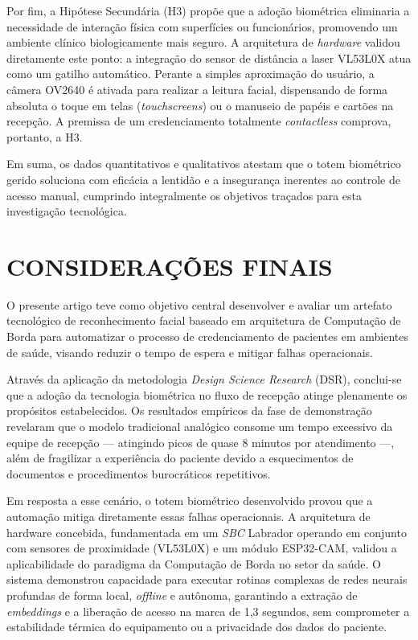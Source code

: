 Por fim, a Hipótese Secundária (H3) propõe que a adoção biométrica eliminaria a necessidade de interação física com superfícies ou funcionários, promovendo um ambiente clínico biologicamente mais seguro. A arquitetura de \textit{hardware} validou diretamente este ponto: a integração do sensor de distância a laser VL53L0X atua como um gatilho automático. Perante a simples aproximação do usuário, a câmera OV2640 é ativada para realizar a leitura facial, dispensando de forma absoluta o toque em telas (\textit{touchscreens}) ou o manuseio de papéis e cartões na recepção. A premissa de um credenciamento totalmente \textit{contactless} comprova, portanto, a H3.  

Em suma, os dados quantitativos e qualitativos atestam que o totem biométrico gerido soluciona com eficácia a lentidão e a insegurança inerentes ao controle de acesso manual, cumprindo integralmente os objetivos traçados para esta investigação tecnológica.

\section{CONSIDERAÇÕES FINAIS}
\label{sec:consideracoes-finais}

O presente artigo teve como objetivo central desenvolver e avaliar um artefato tecnológico de reconhecimento facial baseado em arquitetura de Computação de Borda para automatizar o processo de credenciamento de pacientes em ambientes de saúde, visando reduzir o tempo de espera e mitigar falhas operacionais.  

Através da aplicação da metodologia \textit{Design Science Research} (DSR), conclui-se que a adoção da tecnologia biométrica no fluxo de recepção atinge plenamente os propósitos estabelecidos. Os resultados empíricos da fase de demonstração revelaram que o modelo tradicional analógico consome um tempo excessivo da equipe de recepção — atingindo picos de quase 8 minutos por atendimento —, além de fragilizar a experiência do paciente devido a esquecimentos de documentos e procedimentos burocráticos repetitivos.  

Em resposta a esse cenário, o totem biométrico desenvolvido provou que a automação mitiga diretamente essas falhas operacionais. A arquitetura de hardware concebida, fundamentada em um \textit{SBC} Labrador operando em conjunto com sensores de proximidade (VL53L0X) e um módulo ESP32-CAM, validou a aplicabilidade do paradigma da Computação de Borda no setor da saúde. O sistema demonstrou capacidade para executar rotinas complexas de redes neurais profundas de forma local, \textit{offline} e autônoma, garantindo a extração de \textit{embeddings} e a liberação de acesso na marca de 1,3 segundos, sem comprometer a estabilidade térmica do equipamento ou a privacidade dos dados do paciente. 

